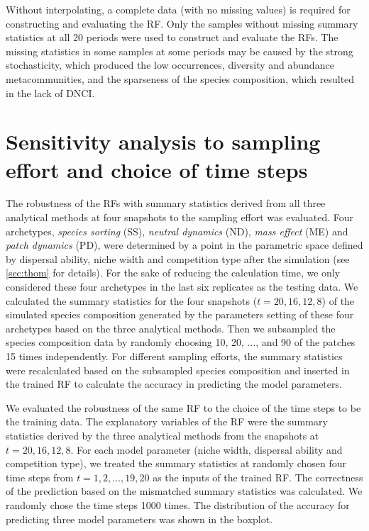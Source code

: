Without interpolating, a complete data (with no missing values) is required for constructing and evaluating the RF. Only the samples without missing summary statistics at all 20 periods were used to construct and evaluate the RFs. The missing statistics in some samples at some periods may be caused by the strong stochasticity, which produced the low occurrences, diversity and abundance metacommunities, and the sparseness of the species composition, which resulted in the lack of DNCI.

\section{Sensitivity analysis to sampling effort and choice of time steps}
\noindent
The robustness of the RFs with summary statistics derived from all three analytical methods at four snapshots to the sampling effort was evaluated. Four archetypes, \textit{species sorting} (SS), \textit{neutral dynamics} (ND), \textit{mass effect} (ME) and \textit{patch dynamics} (PD), were determined by a point in the parametric space defined by dispersal ability, niche width and competition type after the simulation (see \autoref{sec:thom} for details). For the sake of reducing the calculation time, we only considered these four archetypes in the last six replicates as the testing data. We calculated the summary statistics for the four snapshots ($t = 20, 16, 12, 8$) of the simulated species composition generated by the parameters setting of these four archetypes based on the three analytical methods. Then we subsampled the species composition data by randomly choosing 10, 20, ..., and 90 of the patches 15 times independently. For different sampling efforts, the summary statistics were recalculated based on the subsampled species composition and inserted in the trained RF to calculate the accuracy in predicting the model parameters.

We evaluated the robustness of the same RF to the choice of the time steps to be the training data. The explanatory variables of the RF were the summary statistics derived by the three analytical methods from the snapshots at $t = 20, 16, 12, 8$. For each model parameter (niche width, dispersal ability and competition type), we treated the summary statistics at randomly chosen four time steps from $t = 1, 2,\dots, 19, 20$ as the inputs of the trained RF. The correctness of the prediction based on the mismatched summary statistics was calculated. We randomly chose the time steps 1000 times. The distribution of the accuracy for predicting three model parameters was shown in the boxplot.


